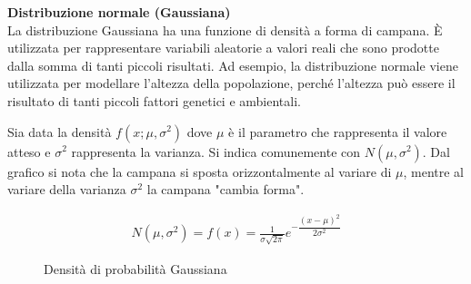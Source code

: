 \begin{defn}
    \textbf{Distribuzione normale (Gaussiana)} \\
    La distribuzione Gaussiana ha una funzione di densità a forma di campana. È
    utilizzata per rappresentare variabili aleatorie a valori reali che sono
    prodotte dalla somma di tanti piccoli risultati. Ad esempio, la
    distribuzione normale viene utilizzata per modellare l'altezza della
    popolazione, perché l'altezza può essere il risultato di tanti piccoli
    fattori genetici e ambientali.

    Sia data la densità $f(x;\mu, \sigma^2)$ dove $\mu$ è il parametro che
    rappresenta il valore atteso e $\sigma^2$ rappresenta la varianza. Si indica
    comunemente con $N(\mu, \sigma^2)$. Dal grafico si nota che la campana si sposta orizzontalmente al
    variare di $\mu$, mentre al variare della varianza $\sigma^2$ la campana
    "cambia forma".

    \begin{equation*}
        \begin{aligned}
            N(\mu, \sigma^2) = f(x) = \frac{1}{\sigma \sqrt{2\pi}} e^{-\dfrac{(x - \mu)^2}{2 \sigma^2}}
        \end{aligned}
    \end{equation*}


    \begin{figure}[htbp!]
        \centering

        \caption{Densità di probabilità Gaussiana}
        \label{gaussian}
    \end{figure}
\end{defn}

\FloatBarrier

